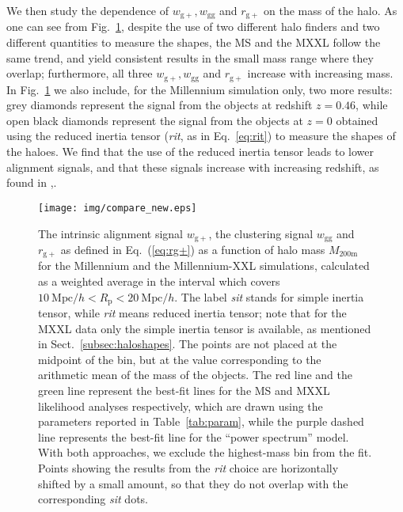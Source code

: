 \documentclass[a4paper,fleqn,usenatbib]{mnras}
\begin{document}
We then study the dependence of $w_{\mathrm{g+}}, w_{\mathrm{gg}}$ and $r_{\mathrm{g+}}$ on the mass of the halo. As one can see from Fig.~\ref{fig:vsmass}, despite the use of two different halo finders and two different quantities to measure the shapes,
the MS and the MXXL follow the same trend, and yield consistent results in the small mass range where they overlap; furthermore, all three $w_{\mathrm{g+}}, w_{\mathrm{gg}}$ and $r_{\mathrm{g+}}$ increase with increasing mass. In Fig.~\ref{fig:vsmass} we also include, for the Millennium simulation only, two more results: grey diamonds represent the signal from the objects at redshift $z = 0.46$, while open black diamonds represent the signal from the objects at $z = 0$ obtained using the reduced inertia tensor (\textit{rit}, as in Eq.~\ref{eq:rit}) to measure the shapes of the haloes. We find that the use of the reduced inertia tensor leads to lower alignment signals, and that these signals increase with increasing redshift, as found in \citet{Joachimietal2013b},. 
\begin{figure}
	\centerline{
	\texttt{[image: img/compare\_new.eps]}}
	\caption{The intrinsic alignment signal $w_{\mathrm{g+}}$, the clustering signal $w_{\mathrm{gg}}$ and $r_{\mathrm{g+}}$ as defined in Eq.~(\ref{eq:rg+}) as a function of halo mass $M_{\mathrm{200m}}$ for the Millennium and the Millennium-XXL simulations, calculated as a weighted average in the interval which covers $10\ \mathrm{Mpc}/h < R_{\mathrm{p}} < 20 \ \mathrm{Mpc}/h$. The label \textit{sit} stands for simple inertia tensor, while \textit{rit} means reduced inertia tensor; note that for the MXXL data only the simple inertia tensor is available, as mentioned in Sect.~\ref{subsec:haloshapes}. The points are not placed at the midpoint of the bin, but at the value corresponding to the arithmetic mean of the mass of the objects. The red line and the green line represent the best-fit lines for the MS and MXXL likelihood analyses respectively, which are drawn using the parameters reported in Table~\ref{tab:param}, while the purple dashed line represents the best-fit line for the ``power spectrum'' model. With both approaches, we exclude the highest-mass bin from the fit. Points showing the results from the \textit{rit} choice are horizontally shifted by a small amount, so that they do not overlap with the corresponding \textit{sit} dots.}
	\label{fig:vsmass}
\end{figure}
\end{document}

